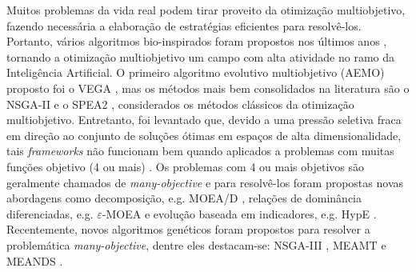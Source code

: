 Muitos problemas da vida real podem tirar proveito da otimização multiobjetivo, fazendo necessária a elaboração de estratégias eficientes para resolvê-los. Portanto, vários algoritmos bio-inspirados foram propostos nos últimos anos \cite{Deb2002,Zitzler2002,Deb2014}, tornando a otimização multiobjetivo um campo com alta atividade no ramo da Inteligência Artificial. O primeiro algoritmo evolutivo multiobjetivo (AEMO) proposto foi o \ac{VEGA} \cite{Schaffer1985}, mas os métodos mais bem consolidados na literatura são o NSGA-II \cite{Deb2002} e o SPEA2 \cite{Zitzler2002}, considerados os métodos clássicos da otimização multiobjetivo. Entretanto, foi levantado que, devido a uma pressão seletiva fraca em direção ao conjunto de soluções ótimas em espaços de alta dimensionalidade, tais \textit{frameworks} não funcionam bem quando aplicados a problemas com muitas funções objetivo (4 ou mais) \cite{Franca2017}. Os problemas com 4 ou mais objetivos são geralmente chamados de \textit{many-objective} e para resolvê-los foram propostas novas abordagens como decomposição, e.g. MOEA/D \cite{Zhang2007}, relações de dominância diferenciadas, e.g. $\varepsilon$-MOEA \cite{Aguirre2009} e evolução baseada em indicadores, e.g. HypE \cite{Bader2011}. Recentemente, novos algoritmos genéticos foram propostos para resolver a problemática \textit{many-objective}, dentre eles destacam-se: NSGA-III \cite{Deb2014}, MEAMT \cite{Brasil2013} e MEANDS \cite{Lafeta2017}.

